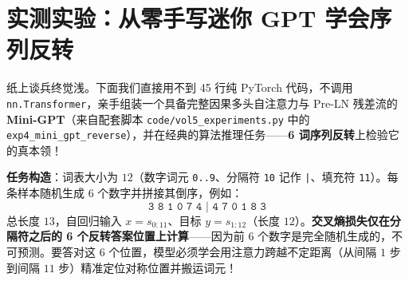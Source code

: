 \section{实测实验：从零手写迷你 GPT 学会序列反转}
\label{sec:exp-minigpt}

纸上谈兵终觉浅。下面我们直接用不到 45 行纯 PyTorch 代码，不调用 \texttt{nn.Transformer}，亲手组装一个具备完整因果多头自注意力与 Pre-LN 残差流的 \textbf{Mini-GPT}（来自配套脚本 \texttt{code/vol5\_experiments.py} 中的 \texttt{exp4\_mini\_gpt\_reverse}），并在经典的算法推理任务——\textbf{6 词序列反转}上检验它的真本领！

\textbf{任务构造}：词表大小为 $12$（数字词元 \texttt{0..9}、分隔符 \texttt{10} 记作 \texttt{|}、填充符 \texttt{11}）。每条样本随机生成 6 个数字并拼接其倒序，例如：
\[
  \texttt{3 8 1 0 7 4 | 4 7 0 1 8 3}
\]
总长度 $13$，自回归输入 $x = s_{0:11}$、目标 $y = s_{1:12}$（长度 $12$）。\textbf{交叉熵损失仅在分隔符之后的 6 个反转答案位置上计算}——因为前 6 个数字是完全随机生成的，不可预测。要答对这 6 个位置，模型必须学会用注意力跨越不定距离（从间隔 $1$ 步到间隔 $11$ 步）精准定位对称位置并搬运词元！

